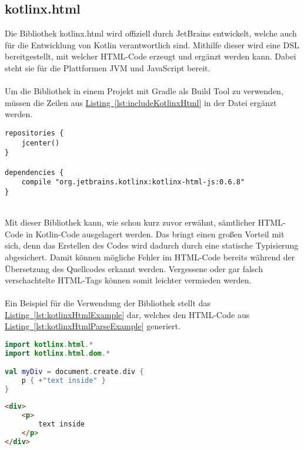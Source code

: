 \subsection{kotlinx.html}\label{sec:kotlinxHtml}
Die Bibliothek kotlinx.html \cite{kotlinxHtml} wird offiziell durch JetBrains entwickelt, welche auch für die Entwicklung von Kotlin verantwortlich sind. Mithilfe dieser wird eine \gls{DSL} bereitgestellt, mit welcher \gls{HTML}-Code erzeugt und ergänzt werden kann. Dabei steht sie für die Plattformen \gls{JVM} und JavaScript bereit.\\
\\
Um die Bibliothek in einem Projekt mit Gradle als Build Tool zu verwenden, müssen die Zeilen aus \hyperref[lst:includeKotlinxHtml]{Listing~\ref{lst:includeKotlinxHtml}} in der Datei  ergänzt werden.
\\
\begin{lstlisting}[style=lstStyleFramed, language=Gradle, caption={Einbindung der Bibliothek kotlinx.html mittels Gradle}, label=lst:includeKotlinxHtml, float]
repositories {
	jcenter()
}

dependencies {
	compile "org.jetbrains.kotlinx:kotlinx-html-js:0.6.8"
}
\end{lstlisting}
\\
Mit dieser Bibliothek kann, wie schon kurz zuvor erwähnt, sämtlicher \gls{HTML}-Code in Kotlin-Code ausgelagert werden. Das bringt einen großen Vorteil mit sich, denn das Erstellen des Codes wird dadurch durch eine statische Typisierung abgesichert. Damit können mögliche Fehler im \gls{HTML}-Code bereits während der Übersetzung des Quellcodes erkannt werden. Vergessene oder gar falsch verschachtelte \gls{HTML}-Tags können somit leichter vermieden werden.\\
\\
Ein Beispiel für die Verwendung der Bibliothek stellt das \hyperref[lst:kotlinxHtmlExample]{Listing~\ref{lst:kotlinxHtmlExample}} dar, welches den \gls{HTML}-Code aus \hyperref[lst:kotlinxHtmlParseExample]{Listing~\ref{lst:kotlinxHtmlParseExample}} generiert.
\\
\begin{lstlisting}[style=lstStyleFramed, language=Kotlin, caption={Beispiel: Verwendung der Bibliothek kotlinx.html \cite{kotlinxHtmlExample}}, label=lst:kotlinxHtmlExample, float]
import kotlinx.html.*
import kotlinx.html.dom.*

val myDiv = document.create.div {
	p { +"text inside" }
}
\end{lstlisting}
\begin{lstlisting}[style=lstStyleFramed, language=html, caption={Beispiel: Verwendung der Bibliothek kotlinx.html (Ergebnis)}, label=lst:kotlinxHtmlParseExample, float]
<div>
	<p>
		text inside
	</p>
</div>
\end{lstlisting}


